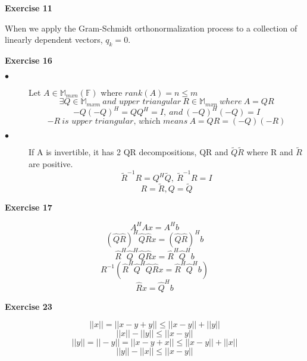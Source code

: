 \documentclass[letterpaper,12pt]{article}
\theoremstyle{definition}
\begin{document}
\noindent\textbf{Exercise 11} 
\begin{description}
\item When we apply the Gram-Schmidt orthonormalization process to a collection of linearly dependent vectors, $q_k = 0$.
\end{description}

\noindent\textbf{Exercise 16} 
\begin{description}
\item[$\bullet$] Let $A \in \mathbb{M}_{mxn}(\mathbb{F})$ where $rank(A) = n \leq m$
\[\exists Q \in \mathbb{M}_{mxm} \ \textit{and upper triangular} \ R \in \mathbb{M}_{mxn} \ where \ A = QR \]
\[-Q(-Q)^H = QQ^H = I, \ and \ (-Q)^H(-Q) = I \]
\[-R \ \textit{is upper triangular, which means} \ A = QR = (-Q)(-R)\]
\item[$\bullet$] If A is invertible, it has 2 QR decompositions, QR and $\tilde{Q}\tilde{R}$ where R and $\tilde{R}$ are positive. 
\[\tilde{R}^{-1}R = Q^H\tilde{Q}, \ \tilde{R}^{-1}R = I\]
\[R = \tilde{R}, Q = \tilde{Q}\]
\end{description}

\noindent\textbf{Exercise 17} 
\begin{description}
\item \[A^HAx = A^Hb\] 
\[(\hat{Q}\hat{R})^H\hat{Q}\hat{R}x = (\hat{Q}\hat{R})^Hb\] 
\[\hat{R}^H\hat{Q}^H\hat{Q}\hat{R}x = \hat{R}^H\hat{Q}^Hb\]
\[R^{-1}(\hat{R}^H\hat{Q}^H\hat{Q}\hat{R}x = \hat{R}^H\hat{Q}^Hb)\]
\[\hat{R}x = \hat{Q}^Hb\]
\end{description}

\noindent\textbf{Exercise 23} 
\begin{description}
\item \[||x|| = ||x - y + y|| \leq ||x - y|| + ||y||\]
\[||x|| - ||y|| \leq ||x - y||\]
\[||y|| = ||-y|| = ||x - y + x|| \leq ||x - y|| +  ||x||\]
\[||y|| - ||x|| \leq ||x - y|| \]
\end{description}
\end{document}
